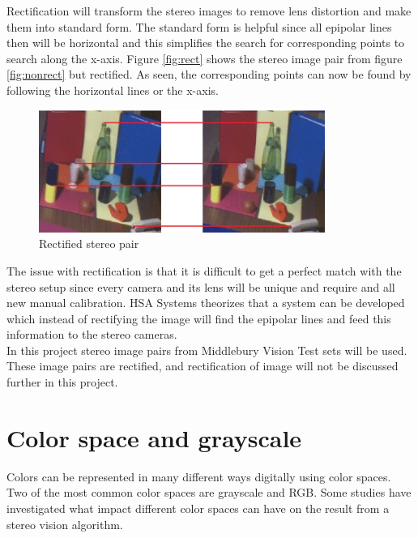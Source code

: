 Rectification will transform the stereo images to remove lens distortion and make them into standard form. The standard form is helpful since all epipolar lines then will be horizontal and this simplifies the search for corresponding points to search along the x-axis. Figure \vref{fig:rect} shows the stereo image pair from figure \vref{fig:nonrect} but rectified. As seen, the corresponding points can now be found by following the horizontal lines or the x-axis.\\

\begin{figure}[ht!]
  \centering
  \includegraphics[height=4cm]{figures/rect}
  \caption{Rectified stereo pair\label{fig:rect} \cite{Mattoccia2013}}
\end{figure}

The issue with rectification is that it is difficult to get a perfect match with the stereo setup since every camera and its lens will be unique and require and all new manual calibration. HSA Systems theorizes that a system can be developed which instead of rectifying the image will find the epipolar lines and feed this information to the stereo cameras.\\

In this project stereo image pairs from Middlebury Vision Test sets \cite{middlebury2016} will be used. These image pairs are rectified, and rectification of image will not be discussed further in this project.

\section{Color space and grayscale}
Colors can be represented in many different ways digitally using color spaces. Two of the most common color spaces are grayscale and RGB. Some studies have investigated what impact different color spaces can have on the result from a stereo vision algorithm.\\ 

